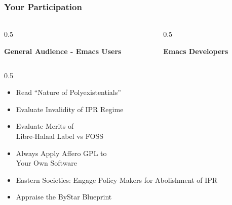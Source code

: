 \begin{whenOrg}
\begin{verblatex}
\begin{frame}[fragile,plain,label=yourParticipation]
    \frametitle{Your Participation}
    \framesubtitle{}


    \begin{columns}

      \begin{column}{0.5\textwidth}

        \begin{center}
          \colorbox{blue!30}{\color{black} \textbf{General Audience - Emacs Users}}
        \end{center}
      \end{column}

      \begin{column}{0.5\textwidth}

        \begin{center}
          \colorbox{blue!60}{\color{white} \textbf{Emacs Developers}}
        \end{center}
      \end{column}

    \end{columns}

    \bigskip

    \begin{columns}

      \begin{column}{0.5\textwidth}

        \begin{itemize}
          \item Read ``Nature of Polyexistentials''
          \item Evaluate Invalidity of IPR Regime
          \item Evaluate Merits of\\ Libre-Halaal Label vs FOSS
          \item Always Apply Affero GPL to\\ Your Own Software
          \item Eastern Societies: Engage Policy Makers for Abolishment of IPR
          \item Appraise the ByStar Blueprint
        \end{itemize}
      \end{column}


\end{columns}
\end{frame}
\end{verblatex}
\end{whenOrg}
